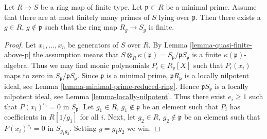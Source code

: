 \begin{lemma}
\label{lemma-generically-finite}
Let $R \to S$ be a ring map of finite type.
Let $\mathfrak p \subset R$ be a minimal prime.
Assume that there are at most finitely many primes of $S$
lying over $\mathfrak p$. Then there exists a
$g \in R$, $g \not \in \mathfrak p$ such that the
ring map $R_g \to S_g$ is finite.
\end{lemma}

\begin{proof}
Let $x_1, \ldots, x_n$ be generators of $S$ over $R$.
By Lemma \ref{lemma-quasi-finite-above-p} the assumption means that
$S \otimes_R \kappa(\mathfrak p) = S_{\mathfrak p}/\mathfrak pS_{\mathfrak p}$
is a finite $\kappa(\mathfrak p)$-algebra.
Thus we may find monic polynomials
$P_i \in R_{\mathfrak p}[X]$ such that $P_i(x_i)$ maps to zero
in $S_{\mathfrak p}/\mathfrak pS_{\mathfrak p}$.
Since $\mathfrak p$ is a minimal prime,
$\mathfrak pR_{\mathfrak p}$ is a locally nilpotent ideal, see
Lemma \ref{lemma-minimal-prime-reduced-ring}.
Hence $\mathfrak pS_{\mathfrak p}$ is a locally nilpotent ideal, see
Lemma \ref{lemma-locally-nilpotent}. Thus
there exist $e_i \geq 1$ such that $P(x_i)^{e_i} = 0$
in $S_{\mathfrak p}$. Let $g_1 \in R$, $g_1 \not \in \mathfrak p$
be an element such that $P_i$ has coefficients in $R[1/g_1]$ for all $i$.
Next, let $g_2 \in R$, $g_2 \not \in \mathfrak p$ be an element
such that $P(x_i)^{e_i} = 0$ in $S_{g_1g_2}$. Setting $g = g_1g_2$
we win.
\end{proof}







